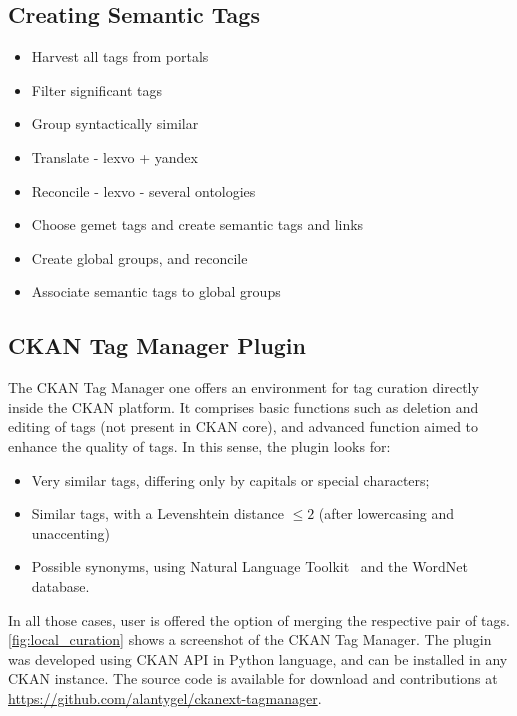 \subsection{Creating Semantic Tags}

\begin{itemize}
	\item Harvest all tags from portals
	\item Filter significant tags
	\item Group syntactically similar
	\item Translate - lexvo + yandex
	\item Reconcile - lexvo - several ontologies
	\item Choose gemet tags and create semantic tags and links
	\item Create global groups, and reconcile
	\item Associate semantic tags to global groups

	
\end{itemize}

\subsection{CKAN Tag Manager Plugin}

The CKAN Tag Manager one offers an environment for tag curation directly inside the CKAN platform. 
It comprises basic functions such as deletion and editing of tags (not present in CKAN core), and advanced function aimed to enhance the quality of tags.
In this sense, the plugin looks for:
\begin{itemize}
	\item Very similar tags, differing only by capitals or special characters;
	\item Similar tags, with a Levenshtein distance $\le 2$ (after lowercasing and unaccenting)
	\item Possible synonyms, using Natural Language Toolkit~\cite{Bird2009} and the WordNet database.
\end{itemize}
In all those cases, user is offered the option of merging the respective pair of tags.
\autoref{fig:local_curation} shows a screenshot of the CKAN Tag Manager.
The plugin was developed using CKAN API in Python language, and can be installed in any CKAN instance. The source code is available for download and contributions at \url{https://github.com/alantygel/ckanext-tagmanager}.


